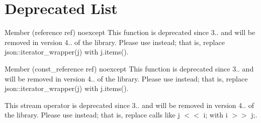 \chapter{Deprecated List}
\hypertarget{deprecated}{}\label{deprecated}

\begin{DoxyRefList}
\item[Member \doxylink{classbasic__json_a091a63384590fe2cf7a122155b30011a}{basic\+\_\+json\texorpdfstring{$<$}{<} Object\+Type, Array\+Type, String\+Type, Boolean\+Type, Number\+Integer\+Type, Number\+Unsigned\+Type, Number\+Float\+Type, Allocator\+Type, JSONSerializer, Binary\+Type \texorpdfstring{$>$}{>}\+::iterator\+\_\+wrapper} (reference ref) noexcept]\label{deprecated__deprecated000001}%
%
This function is deprecated since 3.. and will be removed in version 4.. of the library. Please use  instead; that is, replace {\ttfamily json\+::iterator\+\_\+wrapper(j)} with {\ttfamily j.\+items()}.  
\item[Member \doxylink{classbasic__json_af373ec8f75f254b79fe1b1ca776797b9}{basic\+\_\+json\texorpdfstring{$<$}{<} Object\+Type, Array\+Type, String\+Type, Boolean\+Type, Number\+Integer\+Type, Number\+Unsigned\+Type, Number\+Float\+Type, Allocator\+Type, JSONSerializer, Binary\+Type \texorpdfstring{$>$}{>}\+::iterator\+\_\+wrapper} (const\+\_\+reference ref) noexcept]\label{deprecated__deprecated000002}%
%
This function is deprecated since 3.. and will be removed in version 4.. of the library. Please use  instead; that is, replace {\ttfamily json\+::iterator\+\_\+wrapper(j)} with {\ttfamily j.\+items()}.  
\item[Member \doxylink{classbasic__json_af9907af448f7ff794120033e132025f6}{basic\+\_\+json\texorpdfstring{$<$}{<} Object\+Type, Array\+Type, String\+Type, Boolean\+Type, Number\+Integer\+Type, Number\+Unsigned\+Type, Number\+Float\+Type, Allocator\+Type, JSONSerializer, Binary\+Type \texorpdfstring{$>$}{>}\+::operator\texorpdfstring{$<$}{<}\texorpdfstring{$<$}{<}} (\doxylink{classbasic__json}{basic\+\_\+json} \&j, std\+::istream \&i)]\label{deprecated__deprecated000004}%
%
This stream operator is deprecated since 3.. and will be removed in version 4.. of the library. Please use  instead; that is, replace calls like {\ttfamily j \texorpdfstring{$<$}{<}\texorpdfstring{$<$}{<} i;} with {\ttfamily i \texorpdfstring{$>$}{>}\texorpdfstring{$>$}{>} j;}.  

\end{DoxyRefList}
